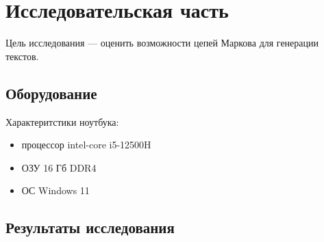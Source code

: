 \chapter{Исследовательская часть}

Цель исследования — оценить возможности цепей Маркова для генерации текстов.

\section{Оборудование}

Характеритстики ноутбука:
\begin{itemize}
	\item процессор intel-core i5-12500H \cite{lib:intel}
	\item ОЗУ 16 Гб DDR4
	\item ОС Windows 11 \cite{lib:windows}
\end{itemize}

\section{Результаты исследования}

